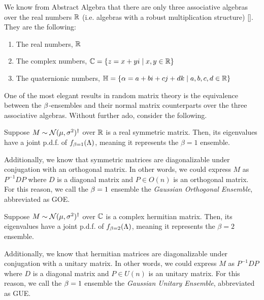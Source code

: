We know from Abstract Algebra that there are only three associative algebras over the real numbers $\mathbb{R}$ (i.e. algebras with a robust multiplication structure) [\cite{dummit}].
They are the following:
\begin{enumerate}
  \item The real numbers, $\mathbb{R}$
  \item The complex numbers, $\mathbb{C} = \{ z = x + yi \mid x,y \in \mathbb{R} \}$
  \item The quaternionic numbers, $\mathbb{H} = \{ \alpha = a + bi + cj + dk \mid a,b,c,d \in \mathbb{R} \}$
\end{enumerate}


One of the most elegant results in random matrix theory is the equivalence between the $\beta$-ensembles
and their normal matrix counterparts over the three associative algebras. Without further ado, consider the following.

\medskip

 Suppose $M \sim \mathcal{N}(\mu,\sigma^2)^\dagger$ over $\mathbb{R}$ is a real symmetric matrix.
Then, its eigenvalues have a joint p.d.f. of $f_{\beta = 1}(\Lambda)$, meaning it represents the $\beta = 1$ ensemble.

Additionally, we know that symmetric matrices are diagonalizable under conjugation with an orthogonal matrix.
In other words, we could express $M$ as $P^{-1} D P$ where $D$ is a diagonal matrix and $P \in O(n)$ is an orthogonal matrix.
For this reason, we call the $\beta = 1$ ensemble the \textit{Gaussian Orthogonal Ensemble}, abbreviated as GOE.

\bigskip

 Suppose $M \sim \mathcal{N}(\mu,\sigma^2)^\dagger$ over $\mathbb{C}$ is a complex hermitian matrix.
Then, its eigenvalues have a joint p.d.f. of $f_{\beta = 2}(\Lambda)$, meaning it represents the $\beta = 2$ ensemble.

Additionally, we know that hermitian matrices are diagonalizable under conjugation with a unitary matrix.
In other words, we could express $M$ as $P^{-1} D P$ where $D$ is a diagonal matrix and $P \in U(n)$ is an unitary matrix.
For this reason, we call the $\beta = 1$ ensemble the \textit{Gaussian Unitary Ensemble}, abbreviated as GUE.

